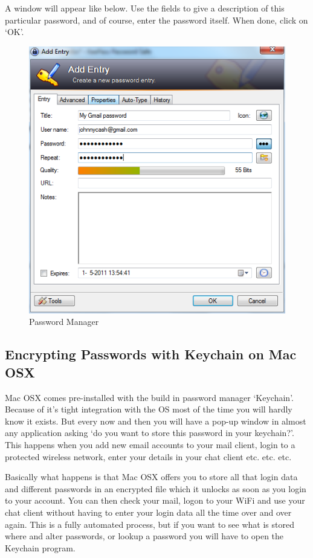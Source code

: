 A window will appear like below. Use the fields to give a description of
this particular password, and of course, enter the password itself. When
done, click on `OK'.

\begin{figure}[htbp]
\centering
\includegraphics{mng_13.png}
\caption{Password Manager}
\end{figure}

\subsection{Encrypting Passwords with Keychain on Mac OSX}

Mac OSX comes pre-installed with the build in password manager
`Keychain'. Because of it's tight integration with the OS most of the
time you will hardly know it exists. But every now and then you will
have a pop-up window in almost any application asking `do you want to
store this password in your keychain?'. This happens when you add new
email accounts to your mail client, login to a protected wireless
network, enter your details in your chat client etc. etc. etc.

Basically what happens is that Mac OSX offers you to store all that
login data and different passwords in an encrypted file which it unlocks
as soon as you login to your account. You can then check your mail,
logon to your WiFi and use your chat client without having to enter your
login data all the time over and over again. This is a fully automated
process, but if you want to see what is stored where and alter
passwords, or lookup a password you will have to open the Keychain
program.


